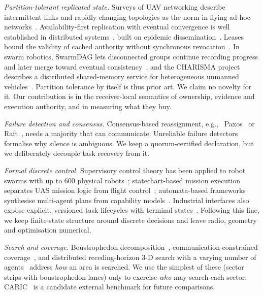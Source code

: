 \documentclass[conference]{IEEEtran}
\newcommand{\eg}{e.g.,\ }
\begin{document}
\emph{Partition-tolerant replicated state.} Surveys of UAV networking
describe intermittent links and rapidly changing topologies as the norm in
flying ad-hoc networks~\cite{bekmezci2013fanet,hayat2016survey}.
Availability-first replication
with eventual convergence is well established in distributed
systems~\cite{decandia2007dynamo,vogels2009eventually,shapiro2011crdt},
built on epidemic dissemination~\cite{demers1987epidemic}. Leases bound the
validity of cached authority without synchronous revocation~\cite{gray1989leases}.
In swarm robotics, SwarmDAG lets disconnected groups continue recording
progress and later merge toward eventual consistency~\cite{tran2019swarmdag},
and the CHARISMA project describes a distributed shared-memory service for
heterogeneous unmanned vehicles~\cite{charisma}. Partition tolerance by itself
is thus prior art. We claim no novelty for it. Our contribution is in the
receiver-local semantics of ownership, evidence and execution authority, and
in measuring what they buy.

\emph{Failure detection and consensus.} Consensus-based reassignment, \eg
Paxos~\cite{lamport1998paxos} or Raft~\cite{ongaro2014raft}, needs a majority
that can communicate. Unreliable failure detectors~\cite{chandra1996unreliable}
formalise why silence is ambiguous. We keep a quorum-certified declaration,
but we deliberately decouple task recovery from it.

\emph{Formal discrete control.} Supervisory control theory has been applied
to robot swarms with up to 600 physical robots~\cite{lopes2016sct};
statechart-based mission execution separates UAS mission logic from flight
control~\cite{santamaria2010mission}; automata-based frameworks synthesise
multi-agent plans from capability models~\cite{tziola2026formal}. Industrial
interfaces also expose explicit, versioned task lifecycles with terminal
states~\cite{anduril_lattice}. Following this line, we keep finite-state
structure around discrete decisions and leave radio, geometry and
optimisation numerical.

\emph{Search and coverage.} Boustrophedon
decomposition~\cite{choset2000boustrophedon,galceran2013coverage}, communication-constrained coverage~\cite{loizou2016dendritic},
and distributed receding-horizon 3-D search with a varying number of
agents~\cite{papaioannou2023glimpse} address \emph{how} an area is searched.
We use the simplest of these (sector strips with boustrophedon lanes) only to
exercise \emph{who} may search each sector. CARIC~\cite{cao2025caric} is a
candidate external benchmark for future comparisons.
\end{document}
